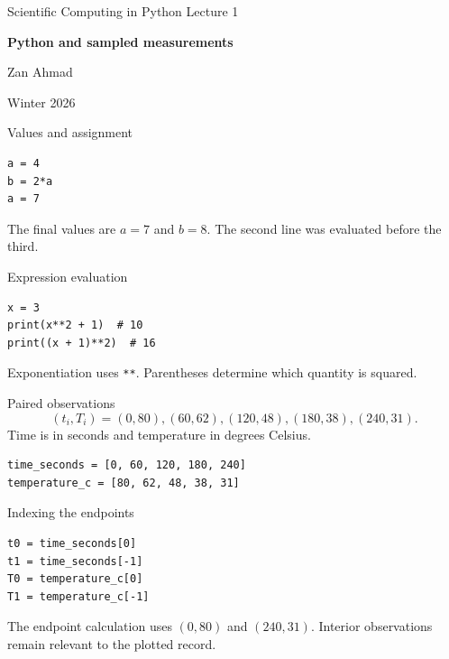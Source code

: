 \documentclass[aspectratio=169,11pt]{beamer}
\newcommand{\notestarget}{notes.pdf}\newcommand{\noteslabel}{Notes}
\begin{document}
\begin{frame}[plain]\vfill
{\small\color{accent} Scientific Computing in Python \quad Lecture 1}\par\medskip
{\raggedright{}\LARGE\bfseries\color{ink} Python and sampled measurements}\par\bigskip
Zan Ahmad\par\smallskip
{\small Winter 2026}\par\vfill\end{frame}
\renewcommand{\notestarget}{notes.pdf\#note-values-and-assignment}
\begin{frame}[t,fragile,label=slide-values-and-assignment]{Values and assignment}
\begin{verbatim}
a = 4
b = 2*a
a = 7
\end{verbatim}
\pause{}
The final values are $a=7$ and $b=8$. The second line was evaluated before the third.
\end{frame}
\renewcommand{\notestarget}{notes.pdf\#note-values-and-assignment}
\begin{frame}[t,fragile,label=slide-expression-evaluation]{Expression evaluation}
\begin{verbatim}
x = 3
print(x**2 + 1)  # 10
print((x + 1)**2)  # 16
\end{verbatim}
\pause{}
Exponentiation uses \texttt{**}. Parentheses determine which quantity is squared.
\end{frame}
\renewcommand{\notestarget}{notes.pdf\#note-paired-observations}
\begin{frame}[t,fragile,label=slide-paired-observations]{Paired observations}
\[
(t_i,T_i)=(0,80),(60,62),(120,48),(180,38),(240,31).
\]
Time is in seconds and temperature in degrees Celsius.
\pause{}
\begin{verbatim}
time_seconds = [0, 60, 120, 180, 240]
temperature_c = [80, 62, 48, 38, 31]
\end{verbatim}
\end{frame}
\renewcommand{\notestarget}{notes.pdf\#note-paired-observations}
\begin{frame}[t,fragile,label=slide-indexing-the-endpoints]{Indexing the endpoints}
\begin{verbatim}
t0 = time_seconds[0]
t1 = time_seconds[-1]
T0 = temperature_c[0]
T1 = temperature_c[-1]
\end{verbatim}
\pause{}
The endpoint calculation uses $(0,80)$ and $(240,31)$. Interior observations remain relevant to the plotted record.
\end{frame}
\end{document}
